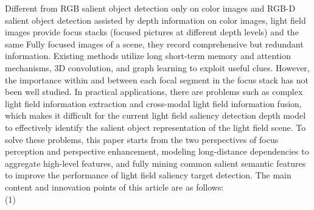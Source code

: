 \begin{englishabstract}
Different from RGB salient object detection only on color images and RGB-D salient object detection assisted by depth information on color images, light field images provide focus stacks (focused pictures at different depth levels) and the same Fully focused images of a scene, they record comprehensive but redundant information. Existing methods utilize long short-term memory and attention mechanisms, 3D convolution, and graph learning to exploit useful clues. However, the importance within and between each focal segment in the focus stack has not been well studied. In practical applications, there are problems such as complex light field information extraction and cross-modal light field information fusion, which makes it difficult for the current light field saliency detection depth model to effectively identify the salient object representation of the light field scene. To solve these problems, this paper starts from the two perspectives of focus perception and perspective enhancement, modeling long-distance dependencies to aggregate high-level features, and fully mining common salient semantic features to improve the performance of light field saliency target detection. The main content and innovation points of this article are as follows:
\\
%
%
%
%
\indent
(1)
%
%

\end{englishabstract}
